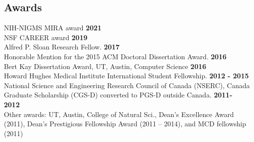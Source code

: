 \documentclass[margin,line,letterpaper]{resume}
\begin{document}
\begin{resume}
    \section{\mysidestyle Awards}
    NIH-NIGMS MIRA award \hfill \textbf{ 2021}\vspace{1mm}\\
    NSF CAREER award \hfill \textbf{ 2019}\vspace{1mm}\\
    Alfred P. Sloan Research Fellow.\hfill \textbf{ 2017}\vspace{1mm}\\
    Honorable Mention for the 2015 ACM Doctoral Dissertation Award.\hfill \textbf{ 2016}\vspace{1mm}\\
     Bert Kay Dissertation Award, UT,  Austin, Computer Science\hfill \textbf{ 2016}\vspace{1mm}\\
     Howard Hughes Medical Institute International Student Fellowship. \hfill \textbf{2012 - 2015}\vspace{1mm}\\
     National Science and Engineering Research Council of Canada (NSERC), 
      Canada Graduate Scholarship (CGS-D) converted to PGS-D outside Canada. \hfill \textbf{2011- 2012} \\
     Other awards: UT,  Austin, College of Natural Sci., Dean's Excellence Award (2011), Dean's Prestigious Fellowship Award (2011 --  2014), and MCD fellowship (2011) %
    
    
    

\end{resume}
\end{document}
